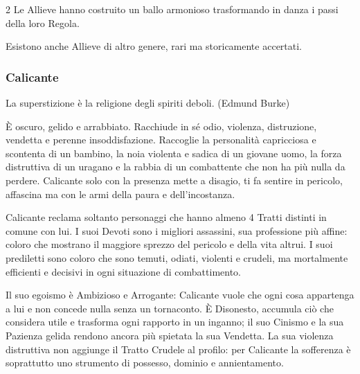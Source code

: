\begin{multicols}{2}
Le Allieve hanno costruito un ballo armonioso trasformando in danza i passi della loro Regola.

Esistono anche Allieve di altro genere, rari ma storicamente accertati.

\subsubsection{Calicante}\label{calicante}\hypertarget{calicante}{}

\begin{enfasi}{
La superstizione è la religione degli spiriti deboli. (Edmund Burke)
}\end{enfasi}

È oscuro, gelido e arrabbiato. Racchiude in sé odio, violenza, distruzione, vendetta e perenne insoddisfazione. Raccoglie la personalità capricciosa e scontenta di un bambino, la noia violenta e sadica di un giovane uomo, la forza distruttiva di un uragano e la rabbia di un combattente che non ha più nulla da perdere. Calicante solo con la presenza mette a disagio, ti fa sentire in pericolo, affascina ma con le armi della paura e dell'incostanza.

Calicante reclama soltanto personaggi che hanno almeno 4 Tratti distinti in comune con lui. I suoi Devoti sono i migliori assassini, sua professione più affine: coloro che mostrano il maggiore sprezzo del pericolo e della vita altrui. I suoi prediletti sono coloro che sono temuti, odiati, violenti e crudeli, ma mortalmente efficienti e decisivi in ogni situazione di combattimento.

Il suo egoismo è Ambizioso e Arrogante: Calicante vuole che ogni cosa appartenga a lui e non concede nulla senza un tornaconto. È Disonesto, accumula ciò che considera utile e trasforma ogni rapporto in un inganno; il suo Cinismo e la sua Pazienza gelida rendono ancora più spietata la sua Vendetta. La sua violenza distruttiva non aggiunge il Tratto Crudele al profilo: per Calicante la sofferenza è soprattutto uno strumento di possesso, dominio e annientamento.


\end{multicols}
